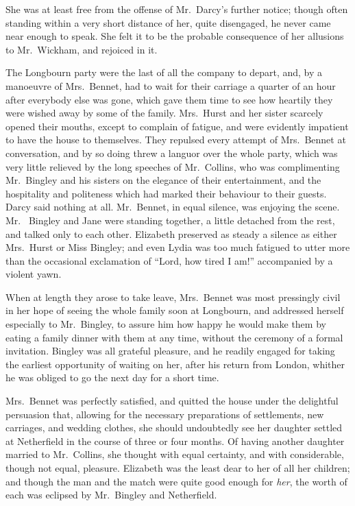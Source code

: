 She was at least free from the offense of Mr.\ Darcy's further
notice; though often standing within a very short distance of her,
quite disengaged, he never came near enough to speak.  She felt
it to be the probable consequence of her allusions to Mr.\ Wickham,
and rejoiced in it.

The Longbourn party were the last of all the company to depart,
and, by a manoeuvre of Mrs.\ Bennet, had to wait for their
carriage a quarter of an hour after everybody else was gone,
which gave them time to see how heartily they were wished
away by some of the family.  Mrs.\ Hurst and her sister scarcely
opened their mouths, except to complain of fatigue, and were
evidently impatient to have the house to themselves.  They
repulsed every attempt of Mrs.\ Bennet at conversation, and by
so doing threw a languor over the whole party, which was very
little relieved by the long speeches of Mr.\ Collins, who was
complimenting Mr.\ Bingley and his sisters on the elegance of
their entertainment, and the hospitality and politeness which had
marked their behaviour to their guests.  Darcy said nothing at all.
Mr.\ Bennet, in equal silence, was enjoying the scene.  Mr.\ %
Bingley and Jane were standing together, a little detached from
the rest, and talked only to each other.  Elizabeth preserved as
steady a silence as either Mrs.\ Hurst or Miss Bingley; and even
Lydia was too much fatigued to utter more than the occasional
exclamation of ``Lord, how tired I am!'' accompanied by a
violent yawn.

When at length they arose to take leave, Mrs.\ Bennet was most
pressingly civil in her hope of seeing the whole family soon
at Longbourn, and addressed herself especially to Mr.\ Bingley,
to assure him how happy he would make them by eating a family
dinner with them at any time, without the ceremony of a formal
invitation.  Bingley was all grateful pleasure, and he readily
engaged for taking the earliest opportunity of waiting on her,
after his return from London, whither he was obliged to go the
next day for a short time.

Mrs.\ Bennet was perfectly satisfied, and quitted the house under
the delightful persuasion that, allowing for the necessary
preparations of settlements, new carriages, and wedding clothes,
she should undoubtedly see her daughter settled at Netherfield in
the course of three or four months.  Of having another daughter
married to Mr.\ Collins, she thought with equal certainty, and
with considerable, though not equal, pleasure.  Elizabeth was the
least dear to her of all her children; and though the man and the
match were quite good enough for \emph{her}, the worth of each was
eclipsed by Mr.\ Bingley and Netherfield.




